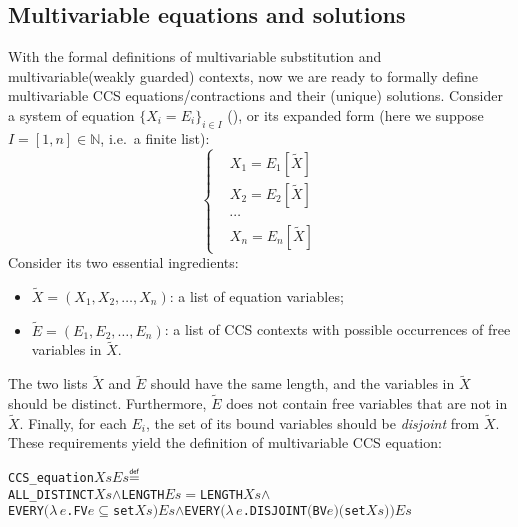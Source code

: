 \documentclass[GCNS]{yincog}
\renewcommand{\HOLConst}[1]{\texttt{#1}}
\renewcommand{\HOLBoundVar}[1]{\ensuremath{\mathit{#1}}}
\renewcommand{\HOLFreeVar}[1]{\ensuremath{\mathit{#1}}}
\renewcommand{\HOLSymConst}[1]{#1}
\renewcommand{\HOLTokenConj}{\ensuremath{\wedge}}
\renewcommand{\HOLTokenSubset}{\ensuremath{\subseteq}}
\renewcommand{\HOLTokenDefEquality}{\ensuremath{\mathrel{\overset{\makebox [0pt]{\text{\tiny \textsf{def}}}}{=}}}}
\renewcommand{\HOLTokenLambda}{\ensuremath{\lambda \,}}
\theoremstyle{remark}
\theoremstyle{theorem}
\theoremstyle{remark}
\newcommand{\multivariate}{multivariable\xspace}
\newcommand{\Multivariate}{Multivariable\xspace}
\renewcommand{\tilde}{\widetilde}
\newcommand{\til}{\tilde}
\begin{document}
\subsection{\Multivariate equations and solutions}
 \label{sec5.4}

With the formal definitions of \multivariate substitution and
\multivariate (weakly guarded) contexts, now we are ready to formally define
\multivariate CCS equations/contractions and their (unique) solutions.
Consider a system of equation $\{X_i = E_i\}_{i\in I}$ (),
or its expanded form (here we suppose $I = [1,n] \in \mathbb{N}$, i.e.~a
finite list):
%
\begin{equation*}
%
\begin{cases}
&X_1 = E_1[\til X]
\\
&X_2 = E_2[\til X]
\\
& \cdots
\\
&X_n = E_n[\til X]
\end{cases}
%
\end{equation*}
%
Consider its two essential ingredients:
%
\begin{itemize}
%
\item $\til X = (X_1, X_2, \ldots , X_n)$: a list of equation variables;
%
\item $\til E = (E_1, E_2, \ldots , E_n)$: a list of CCS contexts with
possible occurrences of free variables in $\til X$.
%
\end{itemize}
%
The two lists $\til X$ and $\til E$ should have the same length, and the
variables in $\til X$ should be distinct. Furthermore, $\til E$ does not
contain free variables that are not in $\til X$. Finally, for each
$E_i$, the set of its bound variables should be \emph{disjoint} from
$\til X$. These requirements yield the  definition of
\multivariate CCS equation:
%
\begin{alltt}
   \HOLConst{CCS\_equation} \HOLFreeVar{Xs} \HOLFreeVar{Es} \HOLTokenDefEquality{}
     \HOLConst{ALL\_DISTINCT} \HOLFreeVar{Xs} \HOLSymConst{\HOLTokenConj{}} \HOLConst{LENGTH} \HOLFreeVar{Es} \HOLSymConst{\ensuremath{=}} \HOLConst{LENGTH} \HOLFreeVar{Xs} \HOLSymConst{\HOLTokenConj{}}
     \HOLConst{EVERY} \ensuremath{(}\HOLTokenLambda{}\HOLBoundVar{e}. \HOLConst{FV} \HOLBoundVar{e} \HOLSymConst{\HOLTokenSubset{}} \HOLConst{set} \HOLFreeVar{Xs}\ensuremath{)} \HOLFreeVar{Es} \HOLSymConst{\HOLTokenConj{}} \HOLConst{EVERY} \ensuremath{(}\HOLTokenLambda{}\HOLBoundVar{e}. \HOLConst{DISJOINT} \ensuremath{(}\HOLConst{BV} \HOLBoundVar{e}\ensuremath{)} \ensuremath{(}\HOLConst{set} \HOLFreeVar{Xs}\ensuremath{)}\ensuremath{)} \HOLFreeVar{Es}
\end{alltt}
\end{document}
